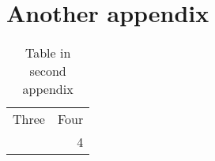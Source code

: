 \documentclass{mpi-far}
\begin{document}
\section{Another appendix}

\begin{table}[h]
\caption{Table in second appendix}
\begin{center}
\fontsize{10}{12}\selectfont
\begin{tabular}{rr}
Three & Four \\ \addlinespace
3 & 4
\end{tabular}
\end{center}
\end{table}

\end{document}
